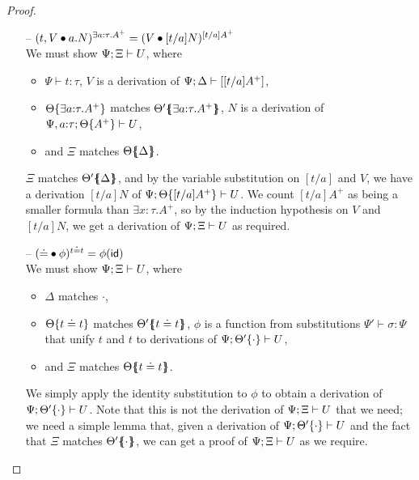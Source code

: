 \begin{proof}
\begin{itemize}
\item[--] $({{t},{V}} \bullet {{a}.{N}})^{\exists a{:}\tau.A^+}
           = ({V} \bullet {[t/a]N})^{[t/a]A^+}$ \\
  We must show ${\Psi};{\Xi} \vdash {U}$, where
  \begin{itemize}
  \item $\Psi \vdash t : \tau$, $V$ is a derivation of 
     ${\Psi};{\Delta} \vdash {[[t/a]A^+]}$,
  \item ${\Theta}\{{\exists a{:}\tau. A^+}\}$ 
     matches ${\Theta'}\mbox{$\{\hspace{-4pt}\{$}{\exists a{:}\tau. A^+}\mbox{$\}\hspace{-4pt}\}$}$, 
     $N$ is a derivation of 
     ${\Psi, a{:}\tau};{{\Theta}\{{A^+}\}} \vdash {U}$,
  \item and $\Xi$ matches ${\Theta}\mbox{$\{\hspace{-4pt}\{$}{\Delta}\mbox{$\}\hspace{-4pt}\}$}$.
  \end{itemize}
  $\Xi$ matches ${\Theta'}\mbox{$\{\hspace{-4pt}\{$}{\Delta}\mbox{$\}\hspace{-4pt}\}$}$, and by the variable
  substitution on $[t/a]$ and $V$, we have a derivation $[t/a]N$ of
  ${\Psi};{{\Theta}\{{[t/a]A^+}\}} \vdash {U}$.  We count $[t/a]A^+$ as
  being a smaller formula than $\exists x{:}\tau.A^+$, so by the
  induction hypothesis on $V$ and $[t/a]N$, we get a derivation of
  ${\Psi};{\Xi} \vdash {U}$ as required.

\item[--] $({{\doteq}} \bullet {\phi})^{t \doteq t} = \phi({\sf id})$\\
  We must show ${\Psi};{\Xi} \vdash {U}$, where
  \begin{itemize}
  \item $\Delta$ matches $\cdot$,
  \item ${\Theta}\{{t \doteq t}\}$ matches ${\Theta'}\mbox{$\{\hspace{-4pt}\{$}{t \doteq t}\mbox{$\}\hspace{-4pt}\}$}$,
     $\phi$ is a function from substitutions $\Psi' \vdash \sigma : \Psi$
     that unify $t$ and $t$ to derivations of 
     ${\Psi};{{\Theta'}\{{\cdot}\}} \vdash {U}$,
  \item and $\Xi$ matches ${\Theta}\mbox{$\{\hspace{-4pt}\{$}{t \doteq t}\mbox{$\}\hspace{-4pt}\}$}$.
  \end{itemize}
  We simply apply the identity substitution to $\phi$
  to obtain a derivation of ${\Psi};{{\Theta'}\{{\cdot}\}} \vdash {U}$.
  Note that this is not the derivation of 
  ${\Psi};{\Xi} \vdash {U}$ that we need; we need a simple lemma that, 
  given a derivation of ${\Psi};{{\Theta'}\{{\cdot}\}} \vdash {U}$
  and the fact that $\Xi$ matches ${\Theta'}\mbox{$\{\hspace{-4pt}\{$}{\cdot}\mbox{$\}\hspace{-4pt}\}$}$,
  we can get a proof of ${\Psi};{\Xi} \vdash {U}$ as we require.

\end{itemize}


\end{proof}
